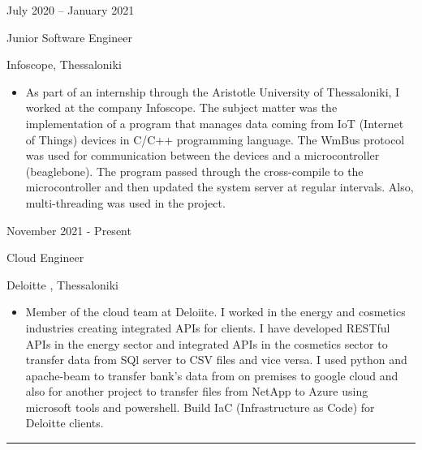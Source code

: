 \documentclass[a4paper,10pt]{article}
\newlength{\cvcolumngapwidth}
\newlength{\cvleftcolumnwidth}
\newlength{\cvrightcolumnwidth}
\newcommand{\cvsectionstyle}[1]{{\normalsize\cvsectionfont\textcolor{cvsectioncolor}{#1}}}
\newcommand{\cvtitlestyle}[1]{{\large\cvtitlefont\textcolor{cvtitlecolor}{#1}}}
\newcommand{\cvdurationstyle}[1]{{\small\cvdurationfont\textcolor{cvdurationcolor}{#1}}}
\newlength{\cvafteritemskipamount}
\newlength{\cvaftersectionskipamount}
\newlength{\cvaftertitleskipamount}
\newlength{\cvparskip}
\newcommand{\cvsection}[1]{
    \begin{minipage}[t]{\cvleftcolumnwidth}
        \raggedleft\cvsectionstyle{#1}
    \end{minipage}%
    \hspace{\cvcolumngapwidth}%
    \begin{minipage}[t]{\cvrightcolumnwidth}
        \textcolor{cvrulecolor}{\rule{\cvrightcolumnwidth}{0.3mm}}
    \end{minipage}

    \vspace{\cvaftersectionskipamount}
}
\newcommand{\cvitem}[2]{
    \begin{minipage}[t]{\cvleftcolumnwidth}
        \raggedleft #1
    \end{minipage}%
    \hspace{\cvcolumngapwidth}%
    \begin{minipage}[t]{\cvrightcolumnwidth}
        \setlength{\parskip}{\cvparskip} #2
    \end{minipage}

    \vspace{\cvafteritemskipamount}
}
\newcommand{\cvtitle}[1]{
    \cvtitlestyle{#1}

    \vspace{\cvaftertitleskipamount}
    \vspace{-\cvparskip}
}
\begin{document}
\cvitem{
    \cvdurationstyle{July 2020 -- January 2021}
}{
    \cvtitle{Junior Software Engineer}

    Infoscope, Thessaloniki

    \begin{itemize}[leftmargin=*]
        \item As part of an internship through the Aristotle University of Thessaloniki, I worked at the company Infoscope. The subject matter was the implementation of a program that manages data coming from IoT (Internet of Things) devices in C/C++ programming language. The WmBus protocol was used for communication between the devices and a microcontroller (beaglebone). The program passed through the cross-compile to the microcontroller and then updated the system server at regular intervals. Also, multi-threading was used in the project.   
             
       
    \end{itemize}
}
\cvitem{
    \cvdurationstyle{November 2021 - Present}
}{

    \cvtitle{Cloud Engineer}  
    Deloitte , Thessaloniki

    \begin{itemize}[leftmargin=*]
        \item Member of the cloud team at Deloiite. I worked in the energy and cosmetics industries creating integrated APIs for clients. I have developed  RESTful APIs in the energy sector and integrated APIs in the cosmetics sector to transfer data from SQl server to CSV files and vice versa. I used python and apache-beam to transfer bank's data from on premises to google cloud  and also for another project to transfer files from NetApp to Azure using microsoft tools and powershell. Build IaC (Infrastructure as Code)  for Deloitte clients.
    \end{itemize}


}





\cvsection{EDUCATION}



\end{document}
